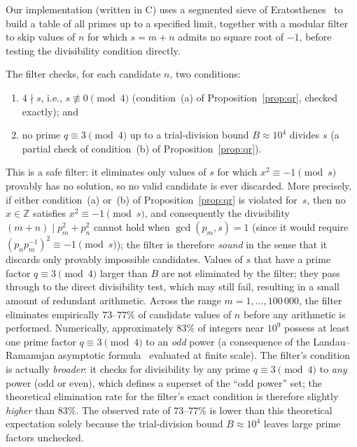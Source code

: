 \documentclass[12pt]{article}
\begin{document}
	Our implementation (written in C) uses a segmented sieve of
	Eratosthenes~\cite{CrandallPomerance} to build a table of all primes up
	to a specified limit, together with a modular filter to skip values of
	$n$ for which $s = m + n$ admits no square root of $-1$, before testing
	the divisibility condition directly.
	
	The filter checks, for each candidate $n$, two conditions:
	\begin{enumerate}
		\item[(a)] $4 \nmid s$, i.e., $s \not\equiv 0 \pmod{4}$
		(condition~(a) of Proposition~\ref{prop:qr}, checked exactly); and
		\item[(b$'$)] no prime $q \equiv 3 \pmod{4}$ up to a trial-division
		bound $B \approx 10^4$ divides $s$ (a partial check of
		condition~(b) of Proposition~\ref{prop:qr}).
	\end{enumerate}
	This is a safe filter: it eliminates only values of $s$ for which
	$x^2 \equiv -1 \pmod{s}$ provably has no solution, so no valid
	candidate is ever discarded.
	More precisely, if either condition~(a) or~(b) of
	Proposition~\ref{prop:qr} is violated for~$s$, then no
	$x \in \mathbb{Z}$ satisfies $x^2 \equiv -1 \pmod{s}$, and
	consequently the divisibility $(m+n) \mid p_m^2 + p_n^2$ cannot hold
	when $\gcd(p_m, s) = 1$ (since it would require
	$(p_n p_m^{-1})^2 \equiv -1 \pmod{s}$); the filter is therefore
	\emph{sound} in the sense that it discards only provably impossible
	candidates.
	Values of $s$ that have a prime factor $q \equiv 3 \pmod{4}$ larger
	than $B$ are not eliminated by the filter; they pass through to the
	direct divisibility test, which may still fail, resulting in a small
	amount of redundant arithmetic.
	Across the range $m = 1, \ldots, 100\,000$, the filter eliminates
	empirically $73$--$77\%$ of candidate values of $n$ before any
	arithmetic is performed.
	Numerically, approximately $83\%$ of integers near $10^9$ possess at
	least one prime factor $q \equiv 3 \pmod{4}$ to an \emph{odd} power
	(a consequence of the Landau--Ramanujan asymptotic
	formula~\cite{Landau1908} evaluated at finite scale).
	The filter's condition is actually \emph{broader}: it checks for
	divisibility by any prime $q \equiv 3 \pmod{4}$ to \emph{any} power
	(odd or even), which defines a superset of the ``odd power'' set;
	the theoretical elimination rate for the filter's exact condition is
	therefore slightly \emph{higher} than $83\%$.
	The observed rate of $73$--$77\%$ is lower than this theoretical
	expectation solely because the trial-division bound $B \approx 10^4$
	leaves large prime factors unchecked.
	
\end{document}

